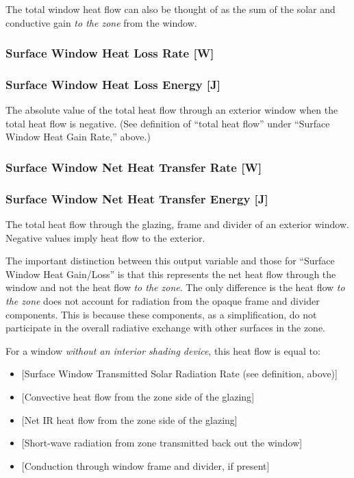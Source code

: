 The total window heat flow can also be thought of as the sum of the solar and conductive gain \emph{to the zone} from the window.

\subsubsection{Surface Window Heat Loss Rate {[}W{]}}\label{surface-window-heat-loss-rate-w}

\subsubsection{Surface Window Heat Loss Energy {[}J{]}}\label{surface-window-heat-loss-energy-j}

The absolute value of the total heat flow through an exterior window when the total heat flow is negative. (See definition of ``total heat flow'' under ``Surface Window Heat Gain Rate,'' above.)

\subsubsection{Surface Window Net Heat Transfer Rate {[}W{]}}\label{surface-window-net-heat-transfer-rate-w}

\subsubsection{Surface Window Net Heat Transfer Energy {[}J{]}}\label{surface-window-net-heat-transfer-rate-j}

The total heat flow through the glazing, frame and divider of an exterior window. Negative values imply heat flow to the exterior.

The important distinction between this output variable and those for ``Surface Window Heat Gain/Loss'' is that this represents the net heat flow through the window and not the heat flow \emph{to the zone}. The only difference is the heat flow \emph{to the zone} does not account for radiation from the opaque frame and divider components. This is because these components, as a simplification, do not participate in the overall radiative exchange with other surfaces in the zone.

For a window \emph{without an interior shading device}, this heat flow is equal to:

\begin{itemize}
\item
  {[}Surface Window Transmitted Solar Radiation Rate (see definition, above){]}
\item
  {[}Convective heat flow from the zone side of the glazing{]}
\item
  {[}Net IR heat flow from the zone side of the glazing{]}
\item
  {[}Short-wave radiation from zone transmitted back out the window{]}
\item
  {[}Conduction through window frame and divider, if present{]}
\end{itemize}

